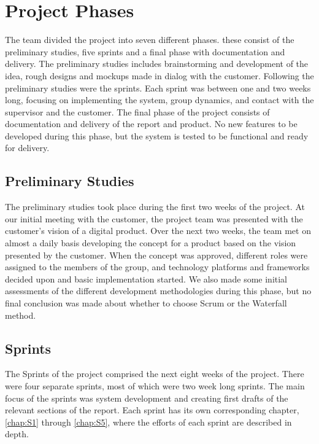 \section{Project Phases}
\label{sec:PlanningProjPhases}
The team divided the project into seven different phases. these consist of the preliminary studies, five sprints and a final phase with documentation and delivery. The preliminary studies includes brainstorming and development of the idea, rough designs and mockups made in dialog with the customer. Following the preliminary studies were the sprints. Each sprint was between one and two weeks long, focusing on implementing the system, group dynamics, and contact with the supervisor and the customer. The final phase of the project consists of documentation and delivery of the report and product. No new features to be developed during this phase, but the system is tested to be functional and ready for delivery.

\subsection{Preliminary Studies}
\label{subsec:PlanningProjPhasesPrelim}
The preliminary studies took place during the first two weeks of the project. At our initial meeting with the customer, the project team was presented with the customer's vision of a digital product. Over the next two weeks, the team met on almost a daily basis developing the concept for a product based on the vision presented by the customer. When the concept was approved, different roles were assigned to the members of the group, and technology platforms and frameworks decided upon and basic implementation started. We also made some initial assessments of the different development methodologies during this phase, but no final conclusion was made about whether to choose Scrum or the Waterfall method.

\subsection{Sprints}
\label{subsec:PlanningProjPhasesSprints}
The Sprints of the project comprised the next eight weeks of the project. There were four separate sprints, most of which were two week long sprints. The main focus of the sprints was system development and creating first drafts of the relevant sections of the report. Each sprint has its own corresponding chapter, \ref{chap:S1} through \ref{chap:S5}, where the efforts of each sprint are described in depth.

